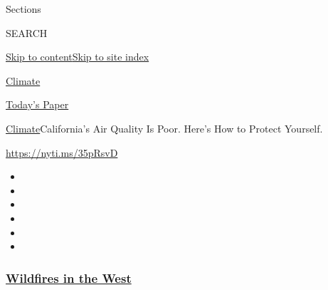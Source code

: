 Sections

SEARCH

\protect\hyperlink{site-content}{Skip to
content}\protect\hyperlink{site-index}{Skip to site index}

\href{https://www.nytimes3xbfgragh.onion/section/climate}{Climate}

\href{https://myaccount.nytimes3xbfgragh.onion/auth/login?response_type=cookie\&client_id=vi}{}

\href{https://www.nytimes3xbfgragh.onion/section/todayspaper}{Today's
Paper}

\href{/section/climate}{Climate}\textbar{}California's Air Quality Is
Poor. Here's How to Protect Yourself.

\url{https://nyti.ms/35pRsvD}

\begin{itemize}
\item
\item
\item
\item
\item
\item
\end{itemize}

\hypertarget{wildfires-in-the-west}{%
\subsubsection{\texorpdfstring{\href{https://www.nytimes3xbfgragh.onion/spotlight/california-wildfires?name=styln-california-wildfires\&region=TOP_BANNER\&block=storyline_menu_recirc\&action=click\&pgtype=Article\&impression_id=55b37860-f52d-11ea-8682-bfbfb46aa2bd\&variant=undefined}{Wildfires
in the West}}{Wildfires in the West}}\label{wildfires-in-the-west}}

